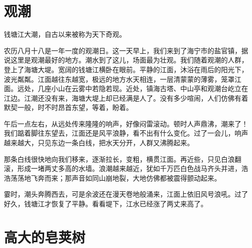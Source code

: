 \documentclass[12pt,UTF-8,openany]{ctexbook}
\begin{document}
\chapter{观潮}

\begin{Large}
    
    钱塘江大潮，自古以来被称为天下奇观。
    
    农历八月十八是一年一度的观潮日。这一天早上，我们来到了海宁市的盐官镇，据说这里是观潮最好的地方。潮水到了这儿，场面最为壮观。我们随着观潮的人群，登上了海塘大堤。宽阔的钱塘江横卧在眼前。平静的江面，沐浴在雨后的阳光下，波光粼粼。江面越往东越宽，极远的地方水天相连，一层清蒙蒙的薄雾，笼罩江面。远处，几座小山在云雾中若隐若现。近处，镇海古塔、中山亭和观潮台屹立在江边。江潮还没有来，海塘大堤上却已经满是人了。没有多少喧闹，人们仿佛有着默契一般，时不时昂首东望，等着，盼着。
    
    午后一点左右，从远处传来隆隆的响声，好像闷雷滚动。顿时人声鼎沸，潮来了！我们踮着脚往东望去，江面还是风平浪静，看不出有什么变化。过了一会儿，响声越来越大，只见东边一条白线，把水天分开，人群又沸腾起来。
    
    那条白线很快地向我们移来，逐渐拉长，变粗，横贯江面。再近些，只见白浪翻滚，形成一堵两丈多高的水墙。浪潮越来越近，犹如千万匹白色战马齐头并进，浩浩荡荡地飞奔而来；那声音如同山崩地裂，大地仿佛都被震得颤动起来。
    
    霎时，潮头奔腾西去，可是余波还在漫天卷地般涌来，江面上依旧风号浪吼。过了好久，钱塘江才恢复了平静。看看堤下，江水已经涨了两丈来高了。
    
\end{Large}

\chapter{高大的皂荚树}
\end{document}
